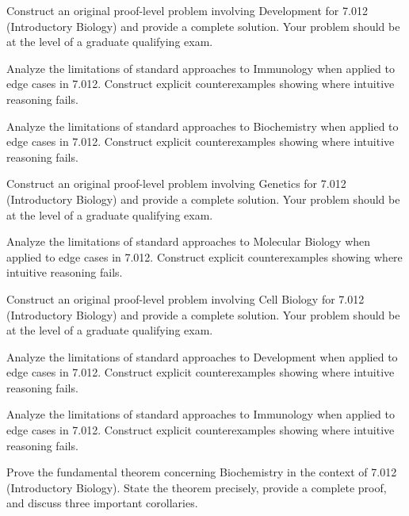 \documentclass[12pt,a4paper]{exam}
\begin{document}
\begin{questions}
\vspace{0.3cm}

\question[3]
Construct an original proof-level problem involving Development for 7.012 (Introductory Biology) and provide a complete solution. Your problem should be at the level of a graduate qualifying exam.

\vspace{0.3cm}

\question[5]
Analyze the limitations of standard approaches to Immunology when applied to edge cases in 7.012. Construct explicit counterexamples showing where intuitive reasoning fails.

\vspace{0.3cm}

\question[2]
Analyze the limitations of standard approaches to Biochemistry when applied to edge cases in 7.012. Construct explicit counterexamples showing where intuitive reasoning fails.

\vspace{0.3cm}

\question[2]
Construct an original proof-level problem involving Genetics for 7.012 (Introductory Biology) and provide a complete solution. Your problem should be at the level of a graduate qualifying exam.

\vspace{0.3cm}

\question[2]
Analyze the limitations of standard approaches to Molecular Biology when applied to edge cases in 7.012. Construct explicit counterexamples showing where intuitive reasoning fails.

\vspace{0.3cm}

\question[4]
Construct an original proof-level problem involving Cell Biology for 7.012 (Introductory Biology) and provide a complete solution. Your problem should be at the level of a graduate qualifying exam.

\vspace{0.3cm}

\question[3]
Analyze the limitations of standard approaches to Development when applied to edge cases in 7.012. Construct explicit counterexamples showing where intuitive reasoning fails.

\vspace{0.3cm}

\question[2]
Analyze the limitations of standard approaches to Immunology when applied to edge cases in 7.012. Construct explicit counterexamples showing where intuitive reasoning fails.

\vspace{0.3cm}

\question[2]
Prove the fundamental theorem concerning Biochemistry in the context of 7.012 (Introductory Biology). State the theorem precisely, provide a complete proof, and discuss three important corollaries.

\vspace{0.3cm}

\end{questions}
\end{document}
